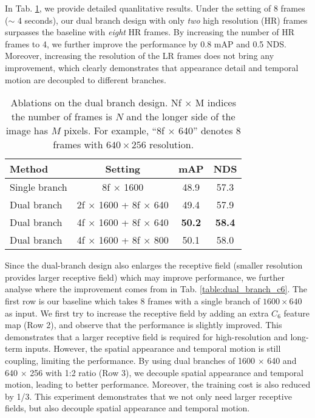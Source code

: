 \documentclass[10pt,twocolumn,letterpaper]{article}
\begin{document}
In Tab. \ref{table:dual_branch}, we provide detailed quanlitative results. Under the setting of 8 frames ($\sim$ 4 seconds), our dual branch design with only \textit{two} high resolution (HR) frames surpasses the baseline with \textit{eight} HR frames. By increasing the number of HR frames to 4, we further improve the performance by 0.8 mAP and 0.5 NDS. Moreover, increasing the resolution of the LR frames does not bring any improvement, which clearly demonstrates that appearance detail and temporal motion are decoupled to different branches.

\begin{table}[t]
  \centering
  \begin{tabular}{l|c|cc}
    \toprule
    Method & Setting & mAP & NDS \\
    \midrule
    Single branch & 8f $\times$ 1600 & 48.9 & 57.3 \\
    Dual branch & 2f $\times$ 1600 + 8f $\times$ 640 & 49.4 & 57.9 \\
    Dual branch & 4f $\times$ 1600 + 8f $\times$ 640 & \textbf{50.2} & \textbf{58.4} \\
    Dual branch & 4f $\times$ 1600 + 8f $\times$ 800 & 50.1 & 58.0 \\
    \bottomrule
  \end{tabular}
  \caption{Ablations on the dual branch design. Nf $\times$ M indices the number of frames is $N$ and the longer side of the image has $M$ pixels. For example, ``8f $\times$ 640'' denotes 8 frames with $640 \times 256$ resolution.}
  \label{table:dual_branch}
\end{table}

Since the dual-branch design also enlarges the receptive field (smaller resolution provides larger receptive field) which may improve performance, we further analyse where the improvement comes from in Tab. \ref{table:dual_branch_c6}. The first row is our baseline which takes 8 frames with a single branch of $1600 \times 640$ as input. We first try to increase the receptive field by adding an extra $C_6$ feature map (Row 2), and observe that the performance is slightly improved. This demonstrates that a larger receptive field is required for high-resolution and long-term inputs. However, the spatial appearance and temporal motion is still coupling, limiting the performance. By using dual branches of 1600 $\times$ 640 and 640 $\times$ 256 with 1:2 ratio (Row 3), we decouple spatial appearance and temporal motion, leading to better performance. Moreover, the training cost is also reduced by 1/3. This experiment demonstrates that we not only need larger receptive fields, but also decouple spatial appearance and temporal motion.
\end{document}
